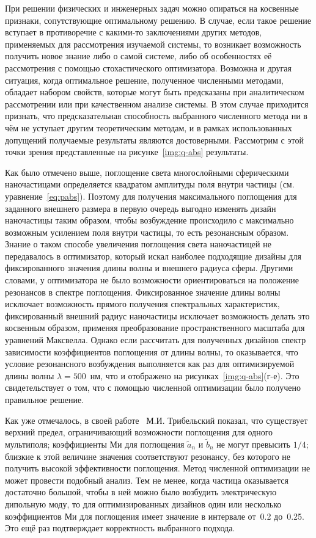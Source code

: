 При решении физических и инженерных задач можно опираться на косвенные
признаки, сопутствующие оптимальному решению.  В случае, если такое
решение вступает в противоречие с какими-то заключениями других
методов, применяемых для рассмотрения изучаемой системы, то возникает
возможность получить новое знание либо о самой системе, либо об
особенностях её рассмотрения с помощью стохастического
оптимизатора. Возможна и другая ситуация, когда оптимальное решение,
полученное численными методами, обладает набором свойств, которые
могут быть предсказаны при аналитическом рассмотрении или при
качественном анализе системы. В этом случае приходится признать, что
предсказательная способность выбранного численного метода ни в чём не
уступает другим теоретическим методам, и в рамках использованных
допущений получаемые результаты являются достоверными. Рассмотрим с
этой точки зрения представленные на рисунке~\ref{img:q-abs}
результаты.

Как было отмечено выше, поглощение света многослойными
сферическими наночастицами определяется квадратом амплитуды поля
внутри частицы (см. уравнение~\ref{eq:pabs}).  Поэтому для получения
максимального поглощения для заданного внешнего размера в первую
очередь выгодно изменять дизайн наночастицы таким образом, чтобы
возбуждение происходило с максимально возможным усилением поля внутри
частицы, то есть резонансным образом.  Знание о таком способе
увеличения поглощения света наночастицей не передавалось в
оптимизатор, который искал наиболее подходящие дизайны для
фиксированного значения длины волны и внешнего радиуса сферы.  Другими
словами, у оптимизатора не было возможности ориентироваться на
положение резонансов в спектре поглощения. Фиксированное значение
длины волны исключает возможность прямого получения спектральных
характеристик, фиксированный внешний радиус наночастицы исключает
возможность делать это косвенным образом, применяя преобразование
пространственного масштаба для уравнений Максвелла. Однако если
рассчитать для полученных дизайнов спектр зависимости коэффициентов
поглощения от длины волны, то оказывается, что условие резонансного
возбуждения выполняется как раз для оптимизируемой длины волны
$\lambda=500$~нм, что и отображено на рисунках~\ref{img:q-abs}(г-е).
Это свидетельствует о том, что с помощью численной оптимизации было
получено правильное решение.

Как уже отмечалось, в своей работе~\cite{Tribelsky-2011}
М.И. Трибельский показал, что существует верхний предел, ограничивающий
возможности поглощения для одного мультиполя; коэффициенты Ми для
поглощения $\tilde{a}_n$ и $\tilde{b}_n$ не могут превысить $1/4$;
близкие к этой величине значения соответствуют резонансу, без которого
не получить высокой эффективности поглощения.  Метод численной
оптимизации не может провести подобный анализ.  Тем не менее, когда
частица оказывается достаточно большой, чтобы в ней можно было
возбудить электрическую дипольную моду, то для оптимизированных
дизайнов один или несколько коэффициентов Ми для поглощения имеет
значение в интервале от~0.2 до~0.25.  Это ещё раз подтверждает
корректность выбранного подхода.

